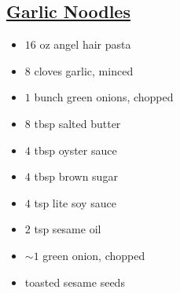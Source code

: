 \begin{minipage}{\textwidth}
\setlength{\columnseprule}{0.5pt}
\begin{vwcol}[widths={0.6,0.4}, rule=0pt]
\begin{minipage}{0.58\linewidth}
\section*{\underline{Garlic Noodles}}
\ingredients
\vspace{1em}

\begin{minipage}{\textwidth}
\setlength{\columnseprule}{0pt}
\begin{multicols*}{2}
\begin{minipage}{\linewidth}
\ingredients[Noodles]
\vspace{-1em}
\begin{itemize}
    \item $16$ oz angel hair pasta
    \item $8$ cloves garlic, minced
    \item $1$ bunch green onions, chopped
    \item $8$ tbsp salted butter
\end{itemize}
\end{minipage}

\columnbreak
\begin{minipage}{\linewidth}
\ingredients[Sauce]
\vspace{-1em}
\begin{itemize}
    \item $4$ tbsp oyster sauce
    \item $4$ tbsp brown sugar
    \item $4$ tsp lite soy sauce
    \item $2$ tsp sesame oil
\end{itemize}
\end{minipage}
\end{multicols*}
\begin{minipage}{\textwidth}
\ingredients[Garnish]
\vspace{-1em}
\begin{itemize}
    \item $\sim1$ green onion, chopped
    \item toasted sesame seeds
\end{itemize}
\end{minipage}
\end{minipage}
\end{minipage}
\begin{minipage}{0.55\textwidth}
\vspace{1em}


\end{minipage}
\end{vwcol}
\end{minipage}
